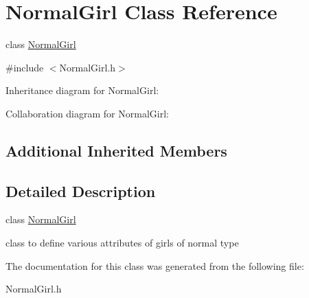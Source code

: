 \hypertarget{classNormalGirl}{}\section{Normal\+Girl Class Reference}
\label{classNormalGirl}


class \hyperlink{classNormalGirl}{Normal\+Girl}  




{\ttfamily \#include $<$Normal\+Girl.\+h$>$}



Inheritance diagram for Normal\+Girl\+:


Collaboration diagram for Normal\+Girl\+:
\subsection*{Additional Inherited Members}


\subsection{Detailed Description}
class \hyperlink{classNormalGirl}{Normal\+Girl} 

class to define various attributes of girls of normal type 

The documentation for this class was generated from the following file\+:\begin{DoxyCompactItemize}
\item 
Normal\+Girl.\+h\end{DoxyCompactItemize}
